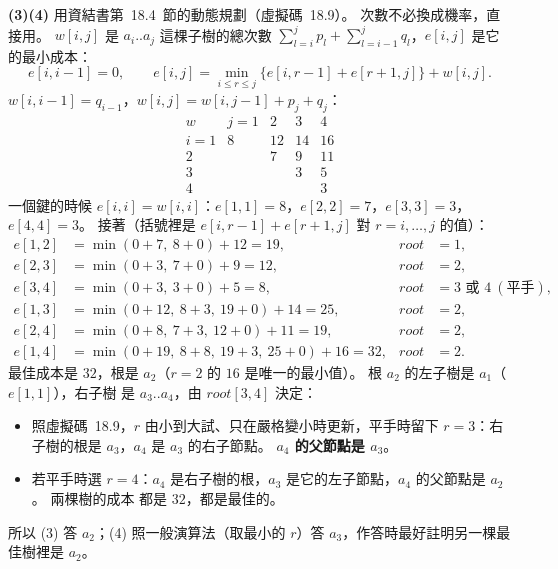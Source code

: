 \begin{pastsoln}
\textbf{(3)(4)} 用資結書第~18.4~節的動態規劃（虛擬碼~18.9）。 次數不必換成機率，直接用。 $w[i, j]$ 是
$a_i..a_j$ 這棵子樹的總次數 $\sum_{l=i}^{j} p_l + \sum_{l=i-1}^{j} q_l$，$e[i, j]$ 是它的最小成本：
\[
e[i, i - 1] = 0, \qquad
e[i, j] = \min_{i \le r \le j} \bigl\{ e[i, r - 1] + e[r + 1, j] \bigr\} + w[i, j].
\]
$w[i, i - 1] = q_{i-1}$，$w[i, j] = w[i, j - 1] + p_j + q_j$：
\[
\begin{array}{c|cccc}
w & j = 1 & 2 & 3 & 4 \\ \hline
i = 1 & 8 & 12 & 14 & 16 \\
2 & & 7 & 9 & 11 \\
3 & & & 3 & 5 \\
4 & & & & 3
\end{array}
\]
一個鍵的時候 $e[i, i] = w[i, i]$：$e[1,1] = 8$，$e[2,2] = 7$，$e[3,3] = 3$，$e[4,4] = 3$。 接著（括號裡是
$e[i, r - 1] + e[r + 1, j]$ 對 $r = i, \ldots, j$ 的值）：
\begin{align*}
e[1,2] &= \min(0 + 7,\ 8 + 0) + 12 = 19, & \mathit{root} &= 1, \\
e[2,3] &= \min(0 + 3,\ 7 + 0) + 9 = 12, & \mathit{root} &= 2, \\
e[3,4] &= \min(0 + 3,\ 3 + 0) + 5 = 8, & \mathit{root} &= 3 \text{ 或 } 4\ (\text{平手}), \\
e[1,3] &= \min(0 + 12,\ 8 + 3,\ 19 + 0) + 14 = 25, & \mathit{root} &= 2, \\
e[2,4] &= \min(0 + 8,\ 7 + 3,\ 12 + 0) + 11 = 19, & \mathit{root} &= 2, \\
e[1,4] &= \min(0 + 19,\ 8 + 8,\ 19 + 3,\ 25 + 0) + 16 = 32, & \mathit{root} &= 2.
\end{align*}
最佳成本是 $32$，根是 $a_2$（$r = 2$ 的 $16$ 是唯一的最小值）。 根 $a_2$ 的左子樹是 $a_1$（$e[1,1]$），右子樹
是 $a_3..a_4$，由 $\mathit{root}[3, 4]$ 決定：
\begin{itemize}
\item 照虛擬碼~18.9，$r$ 由小到大試、只在嚴格變小時更新，平手時留下 $r = 3$：右子樹的根是 $a_3$，$a_4$ 是
$a_3$ 的右子節點。 \textbf{$a_4$ 的父節點是 $a_3$}。
\item 若平手時選 $r = 4$：$a_4$ 是右子樹的根，$a_3$ 是它的左子節點，$a_4$ 的父節點是 $a_2$。 兩棵樹的成本
都是 $32$，都是最佳的。
\end{itemize}
所以 (3) 答 $a_2$；(4) 照一般演算法（取最小的 $r$）答 $a_3$，作答時最好註明另一棵最佳樹裡是 $a_2$。
\begin{center}
\begin{tikzpicture}[x=0.9cm,y=0.9cm,
  kn/.style={circle, draw=black!65, minimum size=0.62cm, inner sep=0pt, font=\small},
  te/.style={draw=black!55}]

\end{tikzpicture}
\end{center}
\end{pastsoln}

